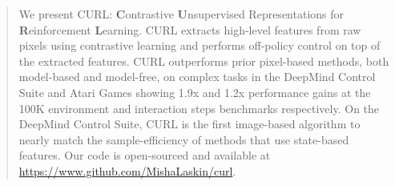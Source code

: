 \begin{abstract}
We present CURL: \textbf{C}ontrastive \textbf{U}nsupervised Representations for \textbf{R}einforcement \textbf{L}earning. CURL extracts high-level features from raw pixels using contrastive learning and performs off-policy control on top of the extracted features. CURL outperforms prior pixel-based methods, both model-based and model-free, on complex tasks in the DeepMind Control Suite and Atari Games showing 1.9x and 1.2x performance gains at the 100K environment and interaction steps benchmarks respectively. On the DeepMind Control Suite, CURL is the first image-based algorithm to nearly match the sample-efficiency of methods that use state-based features. Our code is open-sourced and available at \url{https://www.github.com/MishaLaskin/curl}.
\end{abstract}